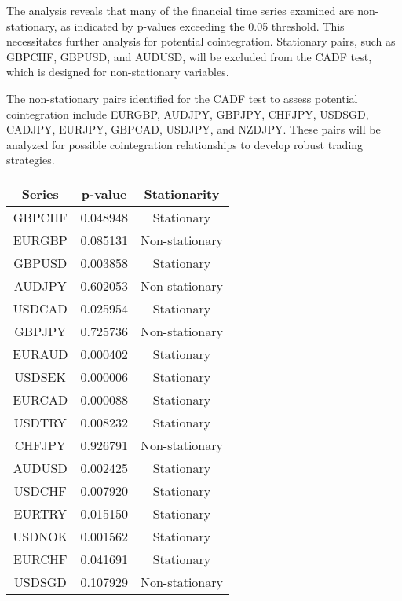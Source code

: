 \documentclass{article}
\begin{document}
The analysis reveals that many of the financial time series examined are non-stationary, as indicated by p-values exceeding the 0.05 threshold. This necessitates further analysis for potential cointegration. Stationary pairs, such as GBPCHF, GBPUSD, and AUDUSD, will be excluded from the CADF test, which is designed for non-stationary variables.

The non-stationary pairs identified for the CADF test to assess potential cointegration include EURGBP, AUDJPY, GBPJPY, CHFJPY, USDSGD, CADJPY, EURJPY, GBPCAD, USDJPY, and NZDJPY. These pairs will be analyzed for possible cointegration relationships to develop robust trading strategies.

\begin{table}[h]
    \centering
    \begin{tabular}{|c|c|c|}
        \hline
        \textbf{Series} & \textbf{p-value} & \textbf{Stationarity} \\
        \hline
        GBPCHF & 0.048948 & Stationary \\
        \hline
        EURGBP & 0.085131 & Non-stationary \\
        \hline
        GBPUSD & 0.003858 & Stationary \\
        \hline
        AUDJPY & 0.602053 & Non-stationary \\
        \hline
        USDCAD & 0.025954 & Stationary \\
        \hline
        GBPJPY & 0.725736 & Non-stationary \\
        \hline
        EURAUD & 0.000402 & Stationary \\
        \hline
        USDSEK & 0.000006 & Stationary \\
        \hline
        EURCAD & 0.000088 & Stationary \\
        \hline
        USDTRY & 0.008232 & Stationary \\
        \hline
        CHFJPY & 0.926791 & Non-stationary \\
        \hline
        AUDUSD & 0.002425 & Stationary \\
        \hline
        USDCHF & 0.007920 & Stationary \\
        \hline
        EURTRY & 0.015150 & Stationary \\
        \hline
        USDNOK & 0.001562 & Stationary \\
        \hline
        EURCHF & 0.041691 & Stationary \\
        \hline
        USDSGD & 0.107929 & Non-stationary \\

\end{tabular}
\end{table}
\end{document}
